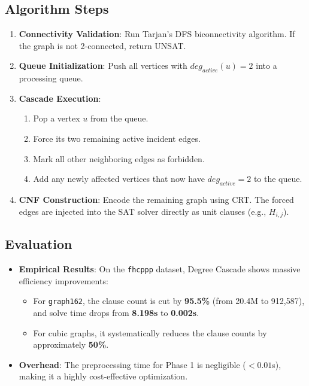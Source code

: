 \subsection{Algorithm Steps}
\begin{enumerate}
    \item \textbf{Connectivity Validation}: Run Tarjan's DFS biconnectivity algorithm. If the graph is not 2-connected, return UNSAT.
    \item \textbf{Queue Initialization}: Push all vertices with $deg_{active}(u) = 2$ into a processing queue.
    \item \textbf{Cascade Execution}:
    \begin{enumerate}
        \item Pop a vertex $u$ from the queue.
        \item Force its two remaining active incident edges.
        \item Mark all other neighboring edges as forbidden.
        \item Add any newly affected vertices that now have $deg_{active} = 2$ to the queue.
    \end{enumerate}
    \item \textbf{CNF Construction}: Encode the remaining graph using CRT. The forced edges are injected into the SAT solver directly as unit clauses (e.g., $H_{i,j}$).
\end{enumerate}

\subsection{Evaluation}
\begin{itemize}
    \item \textbf{Empirical Results}: On the \texttt{fhcppp} dataset, Degree Cascade shows massive efficiency improvements:
    \begin{itemize}
        \item For \texttt{graph162}, the clause count is cut by \textbf{95.5\%} (from 20.4M to 912,587), and solve time drops from \textbf{8.198s} to \textbf{0.002s}.
        \item For cubic graphs, it systematically reduces the clause counts by approximately \textbf{50\%}.
    \end{itemize}
    \item \textbf{Overhead}: The preprocessing time for Phase 1 is negligible ($< 0.01$s), making it a highly cost-effective optimization.
\end{itemize}
